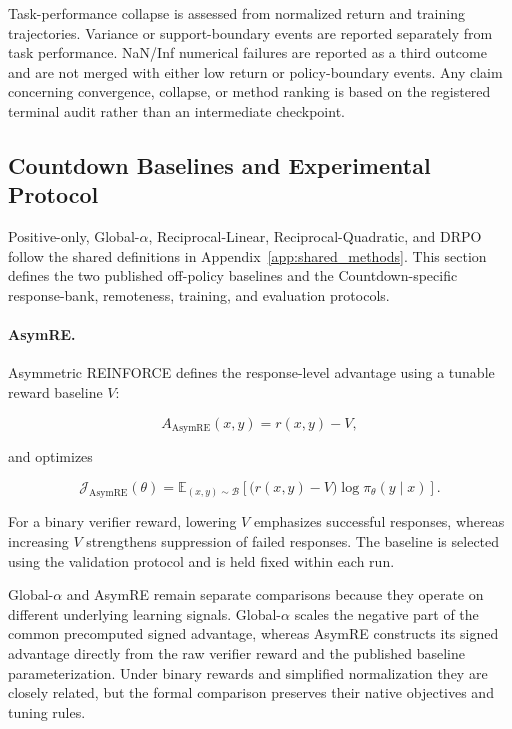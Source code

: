 \documentclass{article}
\theoremstyle{plain}
\theoremstyle{definition}
\theoremstyle{remark}
\begin{document}
Task-performance collapse is assessed from normalized return and
training trajectories. Variance or support-boundary events are reported
separately from task performance. NaN/Inf numerical failures are
reported as a third outcome and are not merged with either low return or
policy-boundary events. Any claim concerning convergence, collapse, or
method ranking is based on the registered terminal audit rather than an
intermediate checkpoint.


\subsection{Countdown Baselines and Experimental Protocol}
\label{app:countdown_methods}

Positive-only, Global-\(\alpha\), Reciprocal-Linear,
Reciprocal-Quadratic, and DRPO follow the shared definitions in
Appendix~\ref{app:shared_methods}. This section defines the two
published off-policy baselines and the Countdown-specific response-bank,
remoteness, training, and evaluation protocols.

\paragraph{AsymRE.}

Asymmetric REINFORCE defines the response-level advantage using a
tunable reward baseline \(V\):

\[
A_{\mathrm{AsymRE}}(x,y)
=
r(x,y)-V,
\]

and optimizes

\[
\mathcal{J}_{\mathrm{AsymRE}}(\theta)
=
\mathbb{E}_{(x,y)\sim\mathcal{B}}
\left[
\bigl(r(x,y)-V\bigr)
\log\pi_\theta(y\mid x)
\right].
\]

For a binary verifier reward, lowering \(V\) emphasizes successful
responses, whereas increasing \(V\) strengthens suppression of failed
responses. The baseline is selected using the validation protocol and
is held fixed within each run.

Global-\(\alpha\) and AsymRE remain separate comparisons because they
operate on different underlying learning signals. Global-\(\alpha\)
scales the negative part of the common precomputed signed advantage,
whereas AsymRE constructs its signed advantage directly from the raw
verifier reward and the published baseline parameterization. Under
binary rewards and simplified normalization they are closely related,
but the formal comparison preserves their native objectives and tuning
rules.
\end{document}
